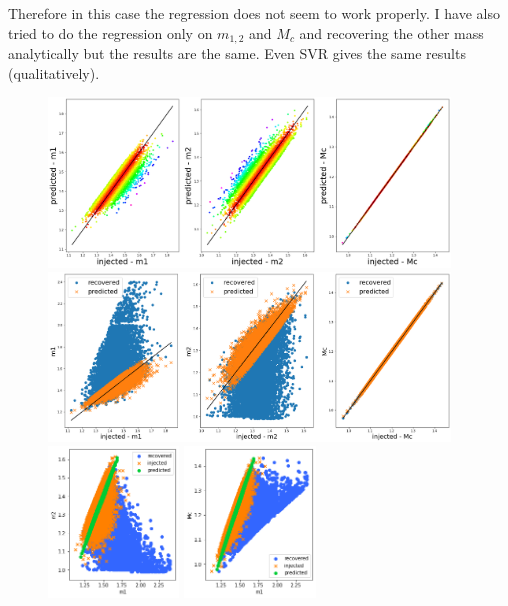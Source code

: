 \documentclass[prd,aps,twocolumn,a4paper,showkeys,nofootinbib]{article}
\begin{document}
Therefore in this case the regression does not seem to work properly. I have also tried to 
do the regression only on $m_{1,2}$ and $M_c$ and recovering the other mass analytically 
but the results are the same. Even SVR gives the same results (qualitatively).
%
\begin{figure}[]
  \center
  \includegraphics[width=0.95\textwidth]{./Figs/GstLAL_regression.png}
  \includegraphics[width=0.95\textwidth]{./Figs/GstLAL_regression_noise.png}
  \includegraphics[width=0.31\textwidth]{./Figs/GstLAL_m2.png}
  \includegraphics[width=0.31\textwidth]{./Figs/GstLAL_Mc.png}

\end{figure}
\end{document}
